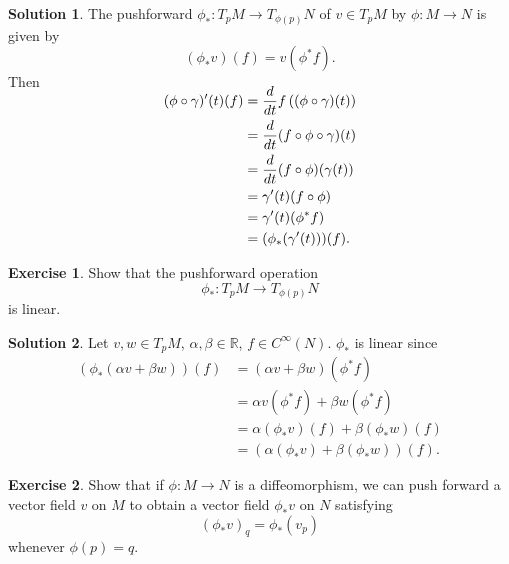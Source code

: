 \documentclass[11pt, a4paper]{article}
\theoremstyle{definition}
\newtheorem{ex}{Exercise}[part]
\newtheorem{sol}{Solution}[part]
\begin{document}
\begin{sol}

The pushforward $\phi_*: T_p M \to T_{\phi(p)} N$ of $v \in T_p M$ by $\phi: M \to N$ is given by
\[
    (\phi_* v) (f) = v (\phi^* f). \tag{pushforward of a vector}\label{eq:pushforwardvector}
\]
Then
\begin{align*}
    \SwapAboveDisplaySkip
    (\phi \circ \gamma)'(t)(f) &= \frac{d}{dt} f\left((\phi \circ \gamma)(t)\right) \\
        &= \frac{d}{dt} (f \circ \phi \circ \gamma)(t) \\
        &= \frac{d}{dt} (f \circ \phi) (\gamma(t)) \\
        &= \gamma'(t)(f \circ \phi) \\
        &= \gamma'(t)(\phi^* f) \\
        &= (\phi_* (\gamma'(t)))(f).
\end{align*}

\end{sol}

\begin{ex}

Show that the pushforward operation
\[
    \phi_*: T_p M \to T_{\phi(p)} N
\]
is linear.

\end{ex}

\begin{sol}

Let $v, w \in T_p M$, $\alpha, \beta \in \mathbb{R}$, $f \in C^\infty(N)$. $\phi_*$ is linear since
\begin{align*}
    \left(\phi_*(\alpha v + \beta w)\right)(f) &= (\alpha v + \beta w) (\phi^* f) \\
        &= \alpha v (\phi^* f) + \beta w (\phi^* f) \\
        &= \alpha (\phi_* v)(f) + \beta (\phi_* w)(f) \\
        &= \left(\alpha (\phi_* v) + \beta (\phi_* w)\right)(f).
\end{align*}

\end{sol}

\begin{ex}

Show that if $\phi: M \to N$ is a diffeomorphism, we can push forward a vector field $v$ on $M$ to obtain a vector field $\phi_*v$ on $N$ satisfying
\[
    {(\phi_* v)}_q = \phi_*(v_p)
\]
whenever $\phi(p) = q$.

\end{ex}
\end{document}
